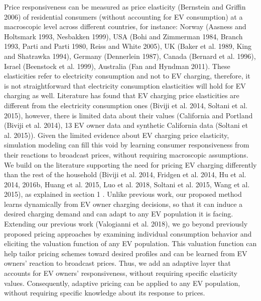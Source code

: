 \documentclass[10pt]{article}
\begin{document}
Price responsiveness can be measured as price elasticity (Bernstein and Griffin 2006) of residential consumers (without accounting for EV consumption) at a macroscopic level across different countries, for instance: Norway (Aasness and Holtsmark 1993, Nesbakken 1999), USA (Bohi and Zimmerman 1984, Branch 1993, Parti and Parti 1980, Reiss and White 2005), UK (Baker et al. 1989, King and Shatrawka 1994), Germany (Dennerlein 1987), Canada (Bernard et al. 1996), Israel (Beenstock et al. 1999), Australia (Fan and Hyndman 2011). These elasticities refer to electricity consumption and not to EV charging, therefore, it is not straightforward that electricity consumption elasticities will hold for EV charging as well. Literature has found that EV charging price elasticities are different from the electricity consumption ones (Biviji et al. 2014, Soltani et al. 2015), however, there is limited data about their values (California and Portland (Biviji et al. 2014), 13 EV owner data and synthetic California data (Soltani et al. 2015)). Given the limited evidence about EV charging price elasticity, simulation modeling can fill this void by learning consumer responsiveness from their reactions to broadcast prices, without requiring macroscopic assumptions. We build on the literature supporting the need for pricing EV charging differently than the rest of the household (Biviji et al. 2014, Fridgen et al. 2014, Hu et al. 2014, 2016b, Huang et al. 2015, Luo et al. 2018, Soltani et al. 2015, Wang et al. 2015), as explained in section 1 . Unlike previous work, our proposed method learns dynamically from EV owner charging decisions, so that it can induce a desired charging demand and can adapt to any EV population it is facing. Extending our previous work (Valogianni et al. 2018), we go beyond previously proposed pricing approaches by examining individual consumption behavior and eliciting the valuation function of any EV population. This valuation function can help tailor pricing schemes toward desired profiles and can be learned from EV owners' reaction to broadcast prices. Thus, we add an adaptive layer that accounts for EV owners' responsiveness, without requiring specific elasticity values. Consequently, adaptive pricing can be applied to any EV population,\\
without requiring specific knowledge about its response to prices.
\end{document}
